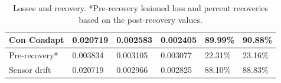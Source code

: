 \documentclass[12pt]{iopart}
\begin{document}
\begin{table}[h]
\begin{tabular}{|l|l|l|l|l|l|}
Con Coadapt    & 0.020719                                                          & 0.002583                                                         & 0.002405                                                             & 89.99\%            & 90.88\%                                                          \\ \hline
Pre-recovery*  & 0.003834                                                          & 0.003105                                                         & 0.003077                                                             & 22.31\%            & 23.16\%                                                          \\ \hline
Sensor drift   & 0.020719                                                          & 0.002966                                                        & 0.002825                                                              & 88.10\%            & 88.83\%                                                          \\ \hline
\end{tabular}
\caption{\label{tab:results}Losses and recovery. *Pre-recovery lesioned loss and percent recoveries based on the post-recovery values.}
\end{table}
\end{document}

